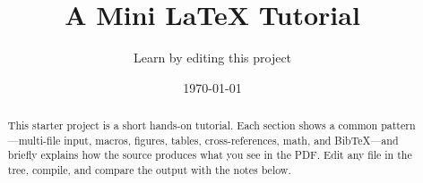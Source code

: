 \documentclass[11pt]{article}
\title{A Mini \LaTeX{} Tutorial}
\author{Learn by editing this project}
\date{\today}
\begin{document}
\maketitle

\begin{abstract}
This starter project is a short hands-on tutorial.
Each section shows a common pattern---multi-file input, macros, figures,
tables, cross-references, math, and BibTeX---and briefly explains how the
source produces what you see in the PDF. Edit any file in the tree, compile,
and compare the output with the notes below.
\end{abstract}

\tableofcontents
\newpage






{}

\end{document}
